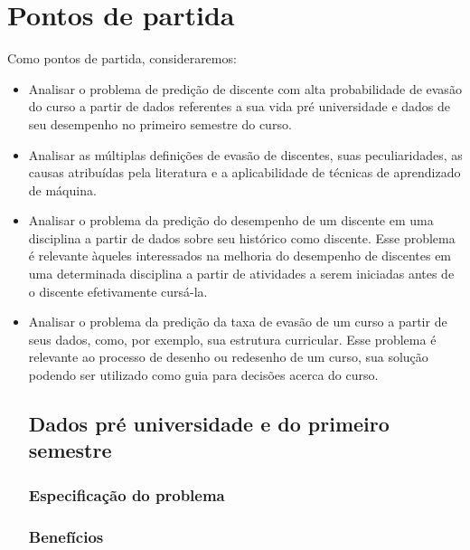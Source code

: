 \chapter{Pontos de partida}

Como pontos de partida, consideraremos:

\begin{itemize}

\item Analisar o problema de predição de discente com alta probabilidade de evasão do curso a partir de dados referentes a sua vida pré universidade e dados de seu desempenho no primeiro semestre do curso.

\item Analisar as múltiplas definições de evasão de discentes, suas peculiaridades, as causas atribuídas pela literatura e a aplicabilidade de técnicas de aprendizado de máquina.

\item Analisar o problema da predição do desempenho de um discente em uma disciplina a partir de dados sobre seu histórico como discente. Esse problema é relevante àqueles interessados na melhoria do desempenho de discentes em uma determinada disciplina a partir de atividades a serem iniciadas antes de o discente efetivamente cursá-la.

\item Analisar o problema da predição da taxa de evasão de um curso a partir de seus dados, como, por exemplo, sua estrutura curricular. Esse problema é relevante ao processo de desenho ou redesenho de um curso, sua solução podendo ser utilizado como guia para decisões acerca do curso.

\section{Dados pré universidade e do primeiro semestre}
\subsection*{Especificação do problema}
\subsection*{Benefícios}

\end{itemize}

